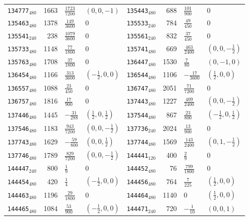 {\begin{longtable}{@{}lrll@{\hspace{2em}}lrll@{}}
\texttt{134777}$_{480}$ & 1663 & $\tfrac{1723}{7200}$ & $(0,0,-1)$ & \texttt{135443}$_{480}$ & 688 & $\tfrac{101}{900}$ & 0\\
\texttt{135463}$_{480}$ & 1378 & $\tfrac{149}{3600}$ & 0 & \texttt{135533}$_{240}$ & 784 & $\tfrac{49}{450}$ & 0\\
\texttt{135541}$_{240}$ & 238 & $\tfrac{1079}{3600}$ & 0 & \texttt{135561}$_{240}$ & 832 & $\tfrac{37}{450}$ & 0\\
\texttt{135733}$_{480}$ & 1148 & $\tfrac{77}{1800}$ & 0 & \texttt{135741}$_{480}$ & 669 & $\tfrac{463}{2400}$ & $(0,0,-\tfrac{1}{2})$\\
\texttt{135763}$_{480}$ & 1708 & $\tfrac{37}{1800}$ & 0 & \texttt{136447}$_{480}$ & 1530 & $\tfrac{7}{80}$ & $(0,-1,0)$\\
\texttt{136454}$_{480}$ & 1166 & $\tfrac{313}{3600}$ & $(-\tfrac{1}{2},0,0)$ & \texttt{136544}$_{480}$ & 1106 & $-\tfrac{17}{3600}$ & $(\tfrac{1}{2},0,0)$\\
\texttt{136557}$_{480}$ & 1088 & $\tfrac{23}{450}$ & 0 & \texttt{136747}$_{480}$ & 2051 & $\tfrac{71}{7200}$ & 0\\
\texttt{136757}$_{480}$ & 1816 & $\tfrac{17}{900}$ & 0 & \texttt{137443}$_{480}$ & 1227 & $\tfrac{409}{2400}$ & $(0,0,-\tfrac{1}{2})$\\
\texttt{137446}$_{480}$ & 1445 & $-\tfrac{31}{288}$ & $(\tfrac{1}{2},0,\tfrac{1}{2})$ & \texttt{137544}$_{480}$ & 867 & $\tfrac{23}{800}$ & $(-\tfrac{1}{2},0,\tfrac{1}{2})$\\
\texttt{137546}$_{480}$ & 1183 & $\tfrac{943}{7200}$ & $(0,0,-\tfrac{1}{2})$ & \texttt{137736}$_{240}$ & 2024 & $\tfrac{13}{900}$ & 0\\
\texttt{137743}$_{480}$ & 1629 & $-\tfrac{59}{800}$ & $(0,0,\tfrac{1}{2})$ & \texttt{137744}$_{480}$ & 1569 & $\tfrac{143}{2400}$ & $(0,1,-\tfrac{1}{2})$\\
\texttt{137746}$_{480}$ & 1789 & $\tfrac{829}{7200}$ & $(0,0,-\tfrac{1}{2})$ & \texttt{144441}$_{120}$ & 400 & $\tfrac{2}{9}$ & 0\\
\texttt{144447}$_{240}$ & 800 & $\tfrac{1}{9}$ & 0 & \texttt{144452}$_{480}$ & 76 & $\tfrac{799}{1800}$ & 0\\
\texttt{144454}$_{480}$ & 420 & $\tfrac{1}{4}$ & $(-\tfrac{1}{2},0,0)$ & \texttt{144456}$_{480}$ & 764 & $\tfrac{7}{225}$ & $(\tfrac{1}{2},0,0)$\\
\texttt{144463}$_{480}$ & 1196 & $\tfrac{29}{1800}$ & 0 & \texttt{144464}$_{480}$ & 1140 & $0$ & $(\tfrac{1}{2},0,0)$\\
\texttt{144465}$_{480}$ & 1084 & $\tfrac{53}{900}$ & $(-\tfrac{1}{2},0,0)$ & \texttt{144471}$_{240}$ & 720 & $-\tfrac{1}{10}$ & $(0,0,1)$\\

\end{longtable}}
